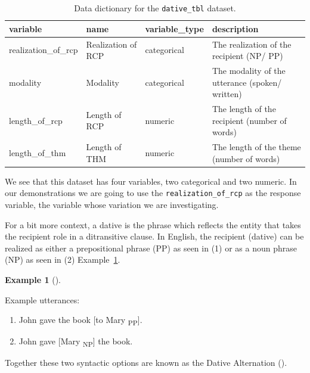 \documentclass[
  letterpaper,
]{latex/krantz}
\providecommand{\tightlist}{%
  \setlength{\itemsep}{0pt}\setlength{\parskip}{0pt}}\usepackage{longtable,booktabs,array}
\theoremstyle{definition}
\newtheorem{example}{Example}[chapter]
\theoremstyle{remark}
\begin{document}
\begin{longtable}[t]{llll}

\caption{\label{tbl-ida-cat-data-dict}Data dictionary for the
\texttt{dative\_tbl} dataset.}

\tabularnewline

\toprule
variable & name & variable\_type & description\\
\midrule
realization\_of\_rcp & Realization of RCP & categorical & The realization of the recipient (NP/ PP)\\
modality & Modality & categorical & The modality of the utterance (spoken/ written)\\
length\_of\_rcp & Length of RCP & numeric & The length of the recipient (number of words)\\
length\_of\_thm & Length of THM & numeric & The length of the theme (number of words)\\
\bottomrule

\end{longtable}

We see that this dataset has four variables, two categorical and two
numeric. In our demonstrations we are going to use the
\texttt{realization\_of\_rcp} as the response variable, the variable
whose variation we are investigating.

For a bit more context, a dative is the phrase which reflects the entity
that takes the recipient role in a ditransitive clause. In English, the
recipient (dative) can be realized as either a prepositional phrase (PP)
as seen in (1) or as a noun phrase (NP) as seen in (2)
Example~\ref{exm-ida-cat-dative-examples}.

\begin{example}[]\protect\hypertarget{exm-ida-cat-dative-examples}{}\label{exm-ida-cat-dative-examples}

Example utterances:

\begin{enumerate}
\def\labelenumi{\arabic{enumi}.}
\tightlist
\item
  John gave the book {[}to Mary \textsubscript{PP}{]}.
\item
  John gave {[}Mary \textsubscript{NP}{]} the book.
\end{enumerate}

\end{example}

Together these two syntactic options are known as the Dative Alternation
().
\end{document}
